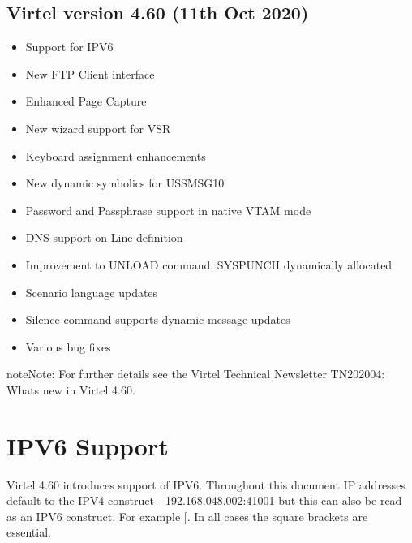 \documentclass[letterpaper,10pt,english]{sphinxmanual}
\begin{document}
\section{Virtel version 4.60 (11th Oct 2020)}
\label{\detokenize{Customization:virtel-version-4-60-11th-oct-2020}}\begin{itemize}
\item {} 
Support for IPV6

\item {} 
New FTP Client interface

\item {} 
Enhanced Page Capture

\item {} 
New wizard support for VSR

\item {} 
Keyboard assignment enhancements

\item {} 
New dynamic symbolics for USSMSG10

\item {} 
Password and Passphrase support in native VTAM mode

\item {} 
DNS support on Line definition

\item {} 
Improvement to UNLOAD command. SYSPUNCH dynamically allocated

\item {} 
Scenario language updates

\item {} 
Silence command supports dynamic message updates

\item {} 
Various bug fixes

\end{itemize}

\begin{sphinxadmonition}{note}{Note:}
For further details see the Virtel Technical Newsletter TN202004: Whats new in Virtel 4.60.
\end{sphinxadmonition}


\chapter{IPV6 Support}
\label{\detokenize{Customization:ipv6-support}}
Virtel 4.60 introduces support of IPV6. Throughout this document IP addresses default to the IPV4 construct - 192.168.048.002:41001 but this can also be read as an IPV6 construct. For example {[}. In all cases the square brackets are essential.
\end{document}
